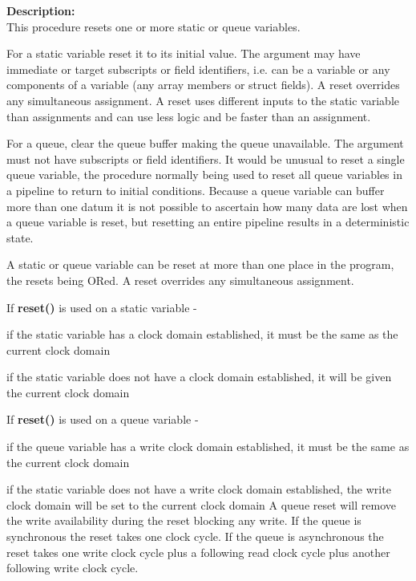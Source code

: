         {\bf Description:} \\
        This procedure resets one or more static or queue variables.
        
        For a static variable reset it to its initial value. The argument may
        have immediate or target subscripts or field identifiers, i.e. can
        be a variable or any components of a variable (any array members or
        struct fields). A reset overrides any simultaneous assignment. A reset
        uses different inputs to the static variable than assignments and can
        use less logic and be faster than an assignment.

        For a queue, clear the queue buffer making the queue unavailable. The
        argument must not have subscripts or field identifiers. It would be
        unusual to reset a single queue variable, the procedure normally being
        used to reset all queue variables in a pipeline to return to initial
        conditions. Because a queue variable can buffer more than one datum it
        is not possible to ascertain how many data are lost when a queue
        variable is reset, but resetting an entire pipeline results in
        a deterministic state.

        A static or queue variable can be reset at more than one place in the
        program, the resets being ORed. A reset overrides any simultaneous
        assignment.
        
        If {\bf reset()} is used on a static variable -
        \blist
        \item   if the static variable has a clock domain established, it
                must be the same as the current clock domain
        \item   if the static variable does not have a clock domain established,
                it will be given the current clock domain
        \blend
        
        If {\bf reset()} is used on a queue variable -
        \blist
        \item   if the queue variable has a write clock domain established, it
                must be the same as the current clock domain
        \item   if the static variable does not have a write clock domain
                established, the write clock domain will be set to the current
                clock domain
        \blend
        A queue reset will remove the write availability during
        the reset blocking any write. If the queue is synchronous the
        reset takes one clock cycle. If the queue is asynchronous the reset
        takes one write clock cycle plus a following read clock cycle plus
        another following write clock cycle.
        
